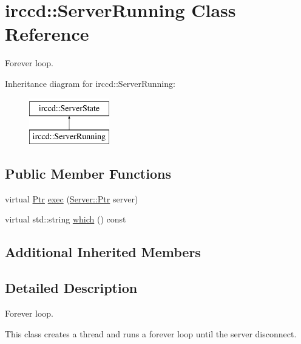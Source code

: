 \hypertarget{a00059}{\section{irccd\-:\-:Server\-Running Class Reference}
\label{a00059}
}


Forever loop.  


Inheritance diagram for irccd\-:\-:Server\-Running\-:\begin{figure}[H]
\begin{center}
\leavevmode
\includegraphics[height=2.000000cm]{a00059}
\end{center}
\end{figure}
\subsection*{Public Member Functions}
\begin{DoxyCompactItemize}
\item 
virtual \hyperlink{a00060_aa1d1595a1abc377d310f06145103d7d3}{Ptr} \hyperlink{a00059_ac41d242e385c7fad5176afd90c2fc3cd}{exec} (\hyperlink{a00055_aea3f9694df81348b909814ac6f84f874}{Server\-::\-Ptr} server)
\begin{DoxyCompactList}\small\item\em \end{DoxyCompactList}\item 
virtual std\-::string \hyperlink{a00059_ae0ec5d53963d8172e2cfb674e19974e1}{which} () const 
\begin{DoxyCompactList}\small\item\em \end{DoxyCompactList}\end{DoxyCompactItemize}
\subsection*{Additional Inherited Members}


\subsection{Detailed Description}
Forever loop. 

This class creates a thread and runs a forever loop until the server disconnect. 

